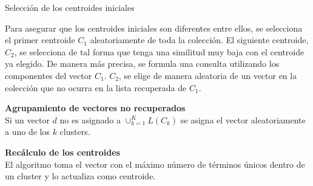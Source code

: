 \begin{frame}{Selección de los centroides
iniciales}

Para asegurar que los centroides iniciales
son diferentes entre ellos, se selecciona el 
primer centroide $C_1$ aleatoriamente de toda
la colección. El siguiente centroide, $C_2$, 
se selecciona de tal forma que tenga una 
similitud muy baja con el centroide ya 
elegido. De manera más precisa, se formula 
una consulta utilizando 
los componentes del vector $C_1$.
$C_2$, se elige de manera aleatoria de un vector en la colección que no ocurra en la lista recuperada de $C_1$.
\end{frame}
\begin{frame}
\textbf{Agrupamiento de vectores no recuperados\\} 
Si un vector $d$ no es asignado a $\cup_{k=1}^K L(C_k)$ se asigna el vector
aleatoriamente a uno de los $k$ clusters.

\textbf{Recálculo de los centroides\\}
El algoritmo toma el vector con el máximo número de términos únicos dentro de un
cluster y lo actualiza como centroide.
\end{frame}